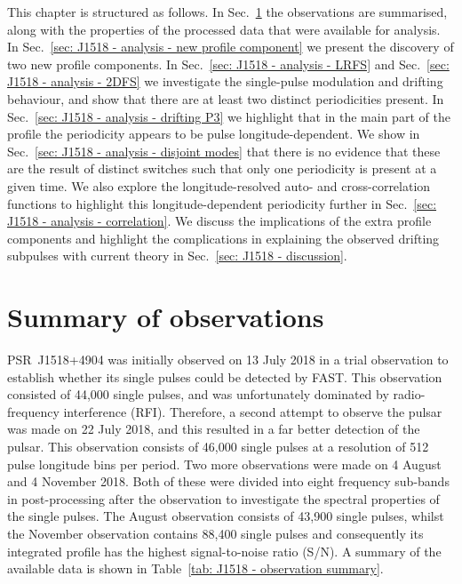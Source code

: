 This chapter is structured as follows. In Sec.~\ref{sec: J1518 - observations} the observations are summarised, along with the properties of the processed data that were available for analysis. In Sec.~\ref{sec: J1518 - analysis - new profile component} we present the discovery of two new profile components. In Sec.~\ref{sec: J1518 - analysis - LRFS} and Sec.~\ref{sec: J1518 - analysis - 2DFS} we investigate the single-pulse modulation and drifting behaviour, and show that there are at least two distinct periodicities present. In Sec.~\ref{sec: J1518 - analysis - drifting P3} we highlight that in the main part of the profile the periodicity appears to be pulse longitude-dependent. We show in Sec.~\ref{sec: J1518 - analysis - disjoint modes} that there is no evidence that these are the result of distinct switches such that only one periodicity is present at a given time. We also explore the longitude-resolved auto- and cross-correlation functions to highlight this longitude-dependent periodicity further in Sec.~\ref{sec: J1518 - analysis - correlation}. We discuss the implications of the extra profile components and highlight the complications in explaining the observed drifting subpulses with current theory in Sec.~\ref{sec: J1518 - discussion}.


\section{Summary of observations}
\label{sec: J1518 - observations}

PSR~J1518+4904 was initially observed on 13 July 2018 in a trial observation to establish whether its single pulses could be detected by FAST. This observation consisted of 44,000 single pulses, and was unfortunately dominated by radio-frequency interference (RFI). Therefore, a second attempt to observe the pulsar was made on 22 July 2018, and this resulted in a far better detection of the pulsar. This observation consists of 46,000 single pulses at a resolution of 512 pulse longitude bins per period. Two more observations were made on 4 August and 4 November 2018. Both of these were divided into eight frequency sub-bands in post-processing after the observation to investigate the spectral properties of the single pulses. The August observation consists of 43,900 single pulses, whilst the November observation contains 88,400 single pulses and consequently its integrated profile has the highest signal-to-noise ratio (S/N). A summary of the available data is shown in Table~\ref{tab: J1518 - observation summary}.

